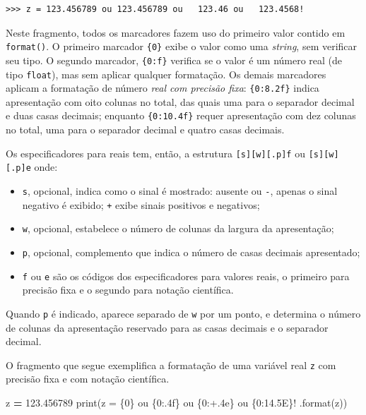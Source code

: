 \documentclass[
]{book}
\newenvironment{Shaded}{\begin{snugshade}}{\end{snugshade}}
\newcommand{\BuiltInTok}[1]{#1}
\newcommand{\FloatTok}[1]{\textcolor[rgb]{0.00,0.00,0.81}{#1}}
\newcommand{\NormalTok}[1]{#1}
\newcommand{\OperatorTok}[1]{\textcolor[rgb]{0.81,0.36,0.00}{\textbf{#1}}}
\newcommand{\SpecialCharTok}[1]{\textcolor[rgb]{0.00,0.00,0.00}{#1}}
\newcommand{\StringTok}[1]{\textcolor[rgb]{0.31,0.60,0.02}{#1}}
\providecommand{\tightlist}{%
  \setlength{\itemsep}{0pt}\setlength{\parskip}{0pt}}
\begin{document}
\begin{verbatim}
>>> z = 123.456789 ou 123.456789 ou   123.46 ou   123.4568!
\end{verbatim}

Neste fragmento, todos os marcadores fazem uso do primeiro valor contido em \texttt{format()}. O primeiro marcador \texttt{\{0\}} exibe o valor como uma \emph{string}, sem verificar seu tipo. O segundo marcador, \texttt{\{0:f\}} verifica se o valor é um número real (de tipo \texttt{float}), mas sem aplicar qualquer formatação. Os demais marcadores aplicam a formatação de número \emph{real com precisão fixa}: \texttt{\{0:8.2f\}} indica apresentação com oito colunas no total, das quais uma para o separador decimal e duas casas decimais; enquanto \texttt{\{0:10.4f\}} requer apresentação com dez colunas no total, uma para o separador decimal e quatro casas decimais.

Os especificadores para reais tem, então, a estrutura \texttt{{[}s{]}{[}w{]}{[}.p{]}f} ou \texttt{{[}s{]}{[}w{]}{[}.p{]}e} onde:

\begin{itemize}
\tightlist
\item
  \texttt{s}, opcional, indica como o sinal é mostrado: ausente ou \texttt{-}, apenas o sinal negativo é exibido; \texttt{+} exibe sinais positivos e negativos;
\item
  \texttt{w}, opcional, estabelece o número de colunas da largura da apresentação;
\item
  \texttt{p}, opcional, complemento que indica o número de casas decimais apresentado;
\item
  \texttt{f} ou \texttt{e} são os códigos dos especificadores para valores reais, o primeiro para precisão fixa e o segundo para notação científica.
\end{itemize}

Quando \texttt{p} é indicado, aparece separado de \texttt{w} por um ponto, e determina o número de colunas da apresentação reservado para as casas decimais e o separador decimal.

O fragmento que segue exemplifica a formatação de uma variável real \texttt{z} com precisão fixa e com notação científica.

\begin{Shaded}
\begin{Highlighting}[]
\NormalTok{z }\OperatorTok{=} \FloatTok{123.456789}
\BuiltInTok{print}\NormalTok{(}\StringTok{\textquotesingle{}z = }\SpecialCharTok{\{0\}}\StringTok{ ou }\SpecialCharTok{\{0:.4f\}}\StringTok{ ou }\SpecialCharTok{\{0:+.4e\}}\StringTok{ ou }\SpecialCharTok{\{0:14.5E\}}\StringTok{!\textquotesingle{}}
\NormalTok{  .}\BuiltInTok{format}\NormalTok{(z))}
\end{Highlighting}
\end{Shaded}
\end{document}
